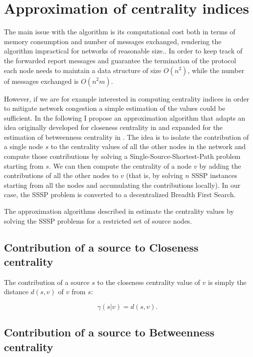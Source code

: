 
\section{Approximation of centrality indices}

The main issue with the \deccen{} algorithm is its computational cost both in terms of memory consumption and number of messages exchanged, rendering the algorithm impractical for networks of reasonable size.. In order to keep track of the forwarded report messages and guarantee the termination of the protocol each node needs to maintain a data structure of size $O(n^2)$, while the number of messages exchanged is $O(n^2m)$.

However, if we are for example interested in computing centrality indices in order to mitigate network congestion a simple estimation of the values could be sufficient. In the following I propose an approximation algorithm that adapts an idea originally developed for closeness centrality in \cite{ew2004} and expanded for the estimation of betweenness centrality in \cite{brandes2007}. The idea is to isolate the contribution of a single node $s$ to the centrality values of all the other nodes in the network and compute those contributions by solving a Single-Source-Shortest-Path problem starting from $s$. We can then compute the centrality of a node $v$ by adding the contributions of all the other nodes to $v$ (that is, by solving $n$ SSSP instances starting from all the nodes and accumulating the contributions locally). In our case, the SSSP problem is converted to a decentralized Breadth First Search.

The approximation algorithms described in \cite{ew2004,brandes2007} estimate the centrality values by solving the SSSP problems for a restricted set of source nodes.

\subsection*{Contribution of a source to Closeness centrality}

The contribution of a source $s$ to the closeness centrality value of $v$ is simply the distance $d(s,v)$ of $v$ from $s$:

\begin{equation}
\gamma(s|v) = d(s,v) .
\end{equation}

\subsection*{Contribution of a source to Betweenness centrality}

